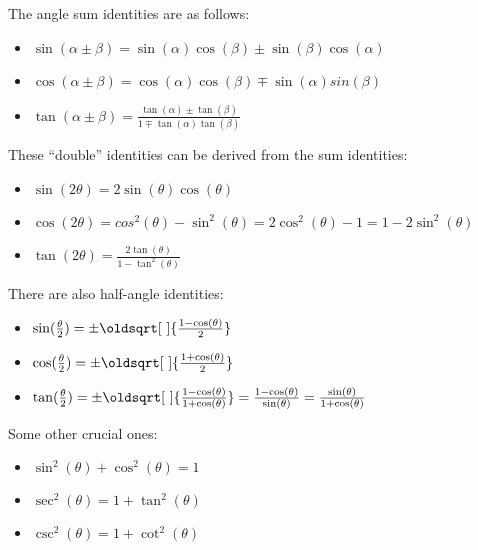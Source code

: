 \documentclass[12pt]{article}
\renewcommand*{\sqrt}[2][\ ]{\oldsqrt[#1]{#2}}
\begin{document}
    \noindent The angle sum identities are as follows:
    \begin{itemize}
        \item \(\sin(\alpha\pm\beta)=\sin(\alpha)\cos(\beta)\pm\sin(\beta)\cos(\alpha)\)
        \item \(\cos(\alpha\pm\beta)=\cos(\alpha)\cos(\beta)\mp\sin(\alpha)sin(\beta)\)
        \item \(\tan(\alpha\pm\beta)=\frac{\tan(\alpha)\pm\tan(\beta)}{1\mp\tan(\alpha)\tan(\beta)}\)
    \end{itemize}

    \noindent These ``double'' identities can be derived from the sum identities:
    \begin{itemize}
        \item \(\sin(2\theta)=2\sin(\theta)\cos(\theta)\)
        \item \(\cos(2\theta)=cos^2(\theta)-\sin^2(\theta)=2\cos^2(\theta)-1=1-2\sin^2(\theta)\)
        \item \(\tan(2\theta)=\frac{2\tan(\theta)}{1-\tan^2(\theta)}\)
    \end{itemize}

    \noindent There are also half-angle identities:
    \begin{itemize}
        \item \(\sin(\frac{\theta}{2})=\pm\sqrt{\frac{1-\cos(\theta)}{2}}\)
        \item \(\cos(\frac{\theta}{2})=\pm\sqrt{\frac{1+\cos(\theta)}{2}}\)
        \item \(\tan(\frac{\theta}{2})=\pm\sqrt{\frac{1-\cos(\theta)}{1+\cos(\theta)}}=\frac{1-\cos(\theta)}{\sin(\theta)}=\frac{\sin(\theta)}{1+\cos(\theta)}\)
    \end{itemize}

    \noindent Some other crucial ones:
    \begin{itemize}
        \item \(\sin^2(\theta)+\cos^2(\theta)=1\)
        \item \(\sec^2(\theta)=1+\tan^2(\theta)\)
        \item \(\csc^2(\theta)=1+\cot^2(\theta)\)
    \end{itemize}
\end{document}
